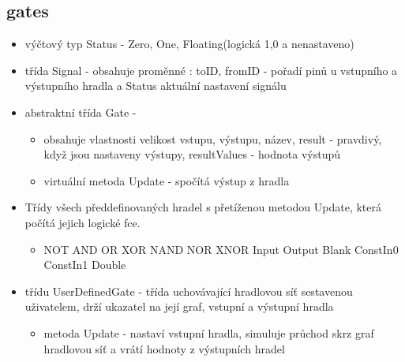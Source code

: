 \documentclass[12pt, oneside]{article}
\begin{document}
\subsection*{gates} 
\begin{itemize} 
\item výčtový typ Status - Zero, One, Floating(logická 1,0 a nenastaveno) 
\item třída Signal - obsahuje proměnné : toID, fromID - pořadí pinů u vstupního a výstupního hradla a Status aktuální nastavení signálu 
\item abstraktní třída Gate - 
\begin{itemize} 
\item obsahuje vlastnosti velikost vstupu, výstupu, název, result - pravdivý, když jsou nastaveny výstupy, resultValues - hodnota výstupů
\item virtuální metoda Update - spočítá výstup z hradla
\end{itemize} 
\item Třídy všech předdefinovaných hradel s přetíženou metodou Update, která počítá jejich logické fce.
\begin{itemize} 
\item NOT AND OR XOR NAND NOR XNOR Input Output Blank ConstIn0 ConstIn1 Double
\end{itemize} 
\item třídu UserDefinedGate - třída uchovávající hradlovou síť sestavenou uživatelem, drží ukazatel na její graf, vstupní a výstupní hradla
\begin{itemize}
\item metoda Update - nastaví vstupní hradla, simuluje průchod skrz graf hradlovou síť a vrátí hodnoty z výstupních hradel 
\end{itemize}
\end{itemize}
\newpage
\end{document}
